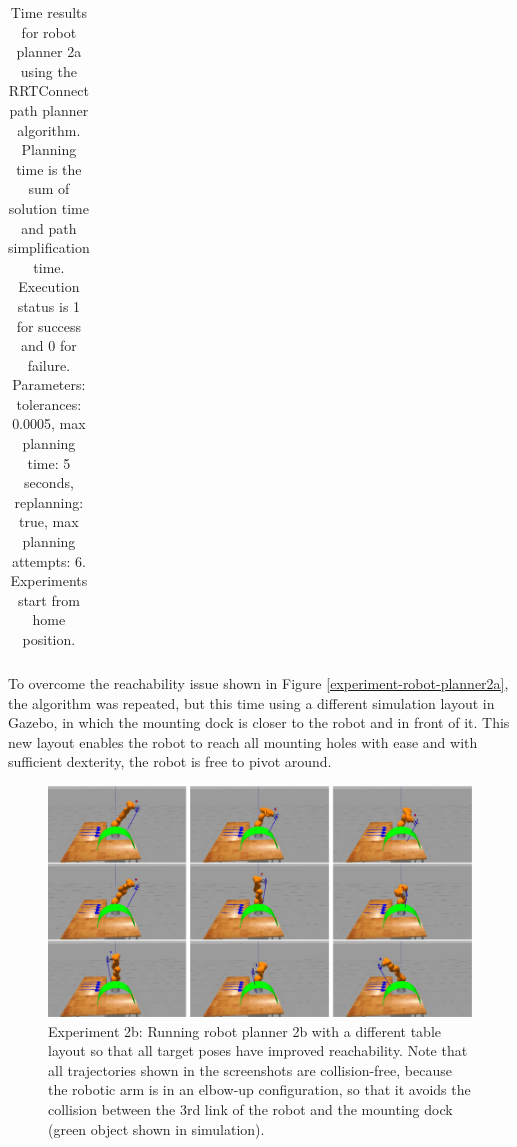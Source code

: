 \begin{longtable}{|p{2cm}|c|p{2cm}|p{2cm}|p{2cm}|}
\caption{Time results for robot planner 2a using the RRTConnect path planner algorithm. Planning time is the sum of solution time and path simplification time. Execution status is 
1 for success and 0 for failure. Parameters: tolerances: 0.0005, max planning time: 5 seconds, replanning: true, max planning attempts: 6. Experiments start from home position.}
\label{robot-planner2a-rrtconnect-data}
\end{longtable}

To overcome the reachability issue shown in Figure \ref{experiment-robot-planner2a}, the algorithm was repeated, but this time using a different simulation layout 
in Gazebo, in which the mounting dock is closer to the robot and in front of it. This new layout enables the robot to reach all mounting holes with ease and 
with sufficient dexterity, the robot is free to pivot around.

\begin{center}
\begin{figure}[!htb]
\centering
\includegraphics[width=\textwidth]{images/robot_planner2b}
\caption{Experiment 2b: Running robot planner 2b with a different table layout so that all target poses have improved reachability. Note that all trajectories shown in the screenshots are collision-free, 
because the robotic arm is in an elbow-up configuration, so that it avoids the collision between the 3rd link of the robot and the mounting dock (green object shown in simulation).}
\label{experiment-robot-planner2b}
\end{figure}
\end{center}


